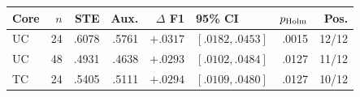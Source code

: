 {\setlength{\tabcolsep}{1.2pt}
\begin{tabular*}{\linewidth}{@{\extracolsep{\fill}}lrrrrlrr@{}}
\toprule
Core & $n$ & STE & Aux. & $\Delta$ F1 & 95\% CI & $p_{\rm Holm}$ & Pos.\\
\midrule
UC & 24 & .6078 & .5761 & $+.0317$ & $[.0182,.0453]$ & .0015 & 12/12\\
UC & 48 & .4931 & .4638 & $+.0293$ & $[.0102,.0484]$ & .0127 & 11/12\\
TC & 24 & .5405 & .5111 & $+.0294$ & $[.0109,.0480]$ & .0127 & 10/12\\
\bottomrule
\end{tabular*}
}
